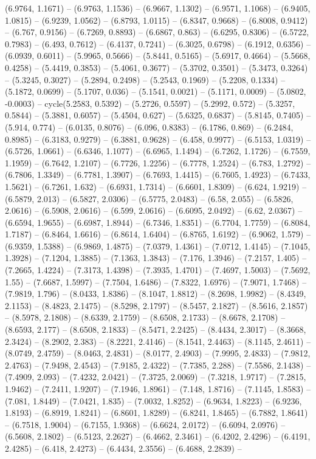 (6.9764, 1.1671) -- (6.9763, 1.1536) -- (6.9667, 1.1302) -- (6.9571, 1.1068) -- (6.9405, 1.0815) -- (6.9239, 1.0562) -- (6.8793, 1.0115) -- (6.8347, 0.9668) -- (6.8008, 0.9412) -- (6.767, 0.9156) -- (6.7269, 0.8893) -- (6.6867, 0.863) -- (6.6295, 0.8306) -- (6.5722, 0.7983) -- (6.493, 0.7612) -- (6.4137, 0.7241) -- (6.3025, 0.6798) -- (6.1912, 0.6356) -- (6.0939, 0.6011) -- (5.9965, 0.5666) -- (5.8441, 0.5165) -- (5.6917, 0.4664) -- (5.5668, 0.4258) -- (5.4419, 0.3853) -- (5.4061, 0.3677) -- (5.3702, 0.3501) -- (5.3473, 0.3264) -- (5.3245, 0.3027) -- (5.2894, 0.2498) -- (5.2543, 0.1969) -- (5.2208, 0.1334) -- (5.1872, 0.0699) -- (5.1707, 0.036) -- (5.1541, 0.0021) -- (5.1171, 0.0009) -- (5.0802, -0.0003) -- cycle(5.2583, 0.5392) -- (5.2726, 0.5597) -- (5.2992, 0.572) -- (5.3257, 0.5844) -- (5.3881, 0.6057) -- (5.4504, 0.627) -- (5.6325, 0.6837) -- (5.8145, 0.7405) -- (5.914, 0.774) -- (6.0135, 0.8076) -- (6.096, 0.8383) -- (6.1786, 0.869) -- (6.2484, 0.8985) -- (6.3183, 0.9279) -- (6.3881, 0.9628) -- (6.458, 0.9977) -- (6.5153, 1.0319) -- (6.5726, 1.0661) -- (6.6346, 1.1077) -- (6.6965, 1.1494) -- (6.7262, 1.1726) -- (6.7559, 1.1959) -- (6.7642, 1.2107) -- (6.7726, 1.2256) -- (6.7778, 1.2524) -- (6.783, 1.2792) -- (6.7806, 1.3349) -- (6.7781, 1.3907) -- (6.7693, 1.4415) -- (6.7605, 1.4923) -- (6.7433, 1.5621) -- (6.7261, 1.632) -- (6.6931, 1.7314) -- (6.6601, 1.8309) -- (6.624, 1.9219) -- (6.5879, 2.013) -- (6.5827, 2.0306) -- (6.5775, 2.0483) -- (6.58, 2.055) -- (6.5826, 2.0616) -- (6.5908, 2.0616) -- (6.599, 2.0616) -- (6.6095, 2.0492) -- (6.62, 2.0367) -- (6.6594, 1.9655) -- (6.6987, 1.8944) -- (6.7346, 1.8351) -- (6.7704, 1.7759) -- (6.8084, 1.7187) -- (6.8464, 1.6616) -- (6.8614, 1.6404) -- (6.8765, 1.6192) -- (6.9062, 1.579) -- (6.9359, 1.5388) -- (6.9869, 1.4875) -- (7.0379, 1.4361) -- (7.0712, 1.4145) -- (7.1045, 1.3928) -- (7.1204, 1.3885) -- (7.1363, 1.3843) -- (7.176, 1.3946) -- (7.2157, 1.405) -- (7.2665, 1.4224) -- (7.3173, 1.4398) -- (7.3935, 1.4701) -- (7.4697, 1.5003) -- (7.5692, 1.55) -- (7.6687, 1.5997) -- (7.7504, 1.6486) -- (7.8322, 1.6976) -- (7.9071, 1.7468) -- (7.9819, 1.796) -- (8.0433, 1.8386) -- (8.1047, 1.8812) -- (8.2698, 1.9982) -- (8.4349, 2.1153) -- (8.4823, 2.1475) -- (8.5298, 2.1797) -- (8.5457, 2.1827) -- (8.5616, 2.1857) -- (8.5978, 2.1808) -- (8.6339, 2.1759) -- (8.6508, 2.1733) -- (8.6678, 2.1708) -- (8.6593, 2.177) -- (8.6508, 2.1833) -- (8.5471, 2.2425) -- (8.4434, 2.3017) -- (8.3668, 2.3424) -- (8.2902, 2.383) -- (8.2221, 2.4146) -- (8.1541, 2.4463) -- (8.1145, 2.4611) -- (8.0749, 2.4759) -- (8.0463, 2.4831) -- (8.0177, 2.4903) -- (7.9995, 2.4833) -- (7.9812, 2.4763) -- (7.9498, 2.4543) -- (7.9185, 2.4322) -- (7.7385, 2.288) -- (7.5586, 2.1438) -- (7.4909, 2.093) -- (7.4232, 2.0421) -- (7.3725, 2.0069) -- (7.3218, 1.9717) -- (7.2815, 1.9462) -- (7.2411, 1.9207) -- (7.1946, 1.8961) -- (7.148, 1.8716) -- (7.1145, 1.8583) -- (7.081, 1.8449) -- (7.0421, 1.835) -- (7.0032, 1.8252) -- (6.9634, 1.8223) -- (6.9236, 1.8193) -- (6.8919, 1.8241) -- (6.8601, 1.8289) -- (6.8241, 1.8465) -- (6.7882, 1.8641) -- (6.7518, 1.9004) -- (6.7155, 1.9368) -- (6.6624, 2.0172) -- (6.6094, 2.0976) -- (6.5608, 2.1802) -- (6.5123, 2.2627) -- (6.4662, 2.3461) -- (6.4202, 2.4296) -- (6.4191, 2.4285) -- (6.418, 2.4273) -- (6.4434, 2.3556) -- (6.4688, 2.2839) -- 